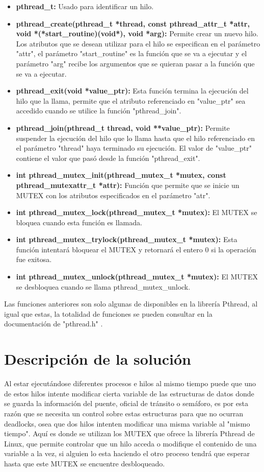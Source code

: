 \documentclass[16pt,a4papper]{article}
\begin{document}
	\begin{itemize}
		\item \textbf{pthread\_t:} Usado para identificar un hilo.
		\item \textbf{pthread\_create(pthread\_t *thread, const pthread\_attr\_t *attr,
			void *(*start\_routine)(void*), void *arg):} Permite crear un nuevo hilo. Los atributos que se desean utilizar para el hilo se especifican en el parámetro "attr", el parámetro "start\_routine" es la función que se va a ejecutar y el parámetro "arg" recibe los argumentos que se quieran pasar a la función que se va a ejecutar.
		\item \textbf{pthread\_exit(void *value\_ptr):} Esta función termina la ejecución del hilo que la llama, permite que el atributo referenciado en "value\_ptr" sea accedido cuando se utilice la función "pthread\_join".
		\item \textbf{pthread\_join(pthread\_t thread, void **value\_ptr):} Permite suspender la ejecución del hilo que lo llama hasta que el hilo referenciado en el parámetro "thread" haya terminado su ejecución. El valor de "value\_ptr" contiene el valor que pasó desde la función "pthread\_exit".
		\item \textbf{int pthread\_mutex\_init(pthread\_mutex\_t *mutex, const pthread\_mutexattr\_t *attr):} Función que permite que se inicie un MUTEX con los atributos especificados en el parámetro "atr".
		\item \textbf{int pthread\_mutex\_lock(pthread\_mutex\_t *mutex):} El MUTEX se bloquea cuando esta función es llamada.
		\item \textbf{int pthread\_mutex\_trylock(pthread\_mutex\_t *mutex):} Esta función intentará bloquear el MUTEX y retornará el entero 0 si la operación fue exitosa.
		\item \textbf{int pthread\_mutex\_unlock(pthread\_mutex\_t *mutex):} El MUTEX se desbloquea cuando se llama pthread\_mutex\_unlock.	
	\end{itemize}

	Las funciones anteriores son solo algunas de disponibles en la librería Pthread, al igual que estas, la totalidad de funciones se pueden consultar en la documentación de "pthread.h" \cite{Pthread_documentation}. 

	\newpage
	\section{Descripción de la solución}
	
	Al estar ejecutándose diferentes procesos e hilos al mismo tiempo puede que uno de estos hilos intente modificar cierta variable de las estructuras de datos donde se guarda la información del puente, oficial de tránsito o semáforo, es por esta razón que se necesita un control sobre estas estructuras para que no ocurran deadlocks, osea que dos hilos intenten modificar una misma variable al "mismo tiempo". Aquí es donde se utilizan los MUTEX que ofrece la librería Pthread de Linux, que permite controlar que un hilo acceda o modifique el contenido de una variable a la vez, si alguien lo esta haciendo el otro proceso tendrá que esperar hasta que este MUTEX se encuentre desbloqueado.
	
\end{document}
